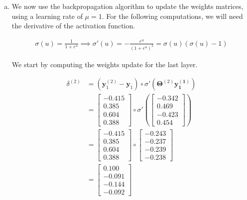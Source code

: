 \documentclass[a4paper, 10pt, twoside]{article}
\begin{document}
\begin{enumerate}[a)]
	\item We now use the backpropagation algorithm to update the weights matrices, using a learning rate of $\mu = 1$.
	      For the following computations, we will need the derivative of the activation function.

	      \begin{align*}
		      \sigma(u) = \frac{1}{1+e^u} \implies \sigma'(u) = - \frac{e^u}{\left(1+e^u\right)^2} = \sigma(u)(\sigma(u)-1)
	      \end{align*}

	      We start by computing the weights update for the last layer.

	      \begin{align*}
		      \delta^{(2)}
		       & = \left(\bm{y}_1^{(2)} - \bm{y}_1\right) \circ \sigma' \left(\bm{\Theta}^{(2)}\bm{y_1^{(1)}}\right) \\
		       & =
		      \begin{bmatrix}
			      -0.415 \\ 0.385 \\ 0.604 \\ 0.388
		      \end{bmatrix} \circ
		      \sigma'
		      \left(
		      \begin{bmatrix}
				      -0.342 \\ 0.469 \\ -0.423 \\ 0.454
			      \end{bmatrix}
		      \right)                                                                                                \\
		       & =
		      \begin{bmatrix}
			      -0.415 \\ 0.385 \\ 0.604 \\ 0.388
		      \end{bmatrix} \circ
		      \begin{bmatrix}
			      -0.243 \\ -0.237 \\ -0.239 \\ -0.238
		      \end{bmatrix}                                                                             \\
		       & =
		      \begin{bmatrix}
			      0.100 \\ -0.091 \\ -0.144 \\ -0.092
		      \end{bmatrix}
	      \end{align*}


\end{enumerate}
\end{document}

